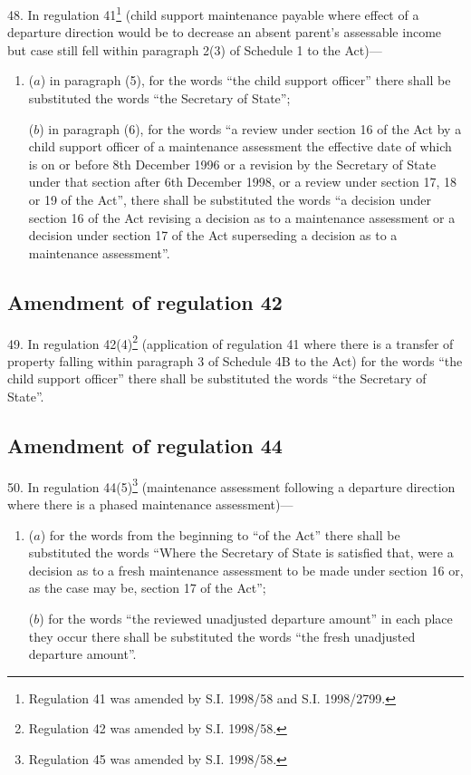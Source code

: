 \documentclass[12pt,a4paper]{article}
\begin{document}
48.  In regulation 41\footnote{\frenchspacing Regulation 41 was amended by S.I. 1998/58 and S.I. 1998/2799.} (child support maintenance payable where effect of a departure direction would be to decrease an absent parent’s assessable income but case still fell within paragraph 2(3) of Schedule 1 to the Act)---
\begin{enumerate}\item[]
($a$) in paragraph (5), for the words “the child support officer” there shall be substituted the words “the Secretary of State”;

($b$) in paragraph (6), for the words “a review under section 16 of the Act by a child support officer of a maintenance assessment the effective date of which is on or before 8th December 1996 or a revision by the Secretary of State under that section after 6th December 1998, or a review under section 17, 18 or 19 of the Act”, there shall be substituted the words “a decision under section 16 of the Act revising a decision as to a maintenance assessment or a decision under section 17 of the Act superseding a decision as to a maintenance assessment”.
\end{enumerate}

\subsection[49. Amendment of regulation 42]{Amendment of regulation 42}

49.  In regulation 42(4)\footnote{\frenchspacing Regulation 42 was amended by S.I. 1998/58.} (application of regulation 41 where there is a transfer of property falling within paragraph 3 of Schedule 4B to the Act) for the words “the child support officer” there shall be substituted the words “the Secretary of State”.

\subsection[50. Amendment of regulation 44]{Amendment of regulation 44}

50.  In regulation 44(5)\footnote{\frenchspacing Regulation 45 was amended by S.I. 1998/58.} (maintenance assessment following a departure direction where there is a phased maintenance assessment)---
\begin{enumerate}\item[]
($a$) for the words from the beginning to “of the Act” there shall be substituted the words “Where the Secretary of State is satisfied that, were a decision as to a fresh maintenance assessment to be made under section 16 or, as the case may be, section 17 of the Act”;

($b$) for the words “the reviewed unadjusted departure amount” in each place they occur there shall be substituted the words “the fresh unadjusted departure amount”.
\end{enumerate}
\end{document}
